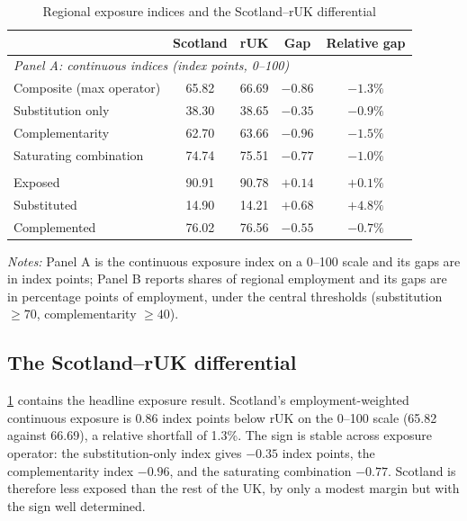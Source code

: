 \begin{table}[t]
\centering
\caption{Regional exposure indices and the Scotland--rUK differential}
\label{tab:headline}
\small
\begin{tabular}{lcccc}
\toprule
 & Scotland & rUK & Gap & Relative gap \\
\midrule
\multicolumn{5}{l}{\textit{Panel A: continuous indices (index points, 0--100)}} \\
Composite (max operator)   & 65.82 & 66.69 & $-0.86$ & $-1.3\%$ \\
Substitution only          & 38.30 & 38.65 & $-0.35$ & $-0.9\%$ \\
Complementarity            & 62.70 & 63.66 & $-0.96$ & $-1.5\%$ \\
Saturating combination     & 74.74 & 75.51 & $-0.77$ & $-1.0\%$ \\
\addlinespace
\multicolumn{5}{l}{\textit{Panel B: classified employment shares (\%)}} \\
Exposed        & 90.91 & 90.78 & $+0.14$ & $+0.1\%$ \\
Substituted    & 14.90 & 14.21 & $+0.68$ & $+4.8\%$ \\
Complemented   & 76.02 & 76.56 & $-0.55$ & $-0.7\%$ \\
\bottomrule
\end{tabular}
\begin{minipage}{0.92\textwidth}
\vspace{0.4em}\footnotesize
\textit{Notes:} 
Panel A is the continuous exposure index on a 0--100 scale and its gaps are in index points; Panel B reports shares of regional employment and its gaps are in percentage points of employment, under the central thresholds (substitution $\ge 70$, complementarity $\ge 40$).
\end{minipage}
\end{table}
 
\subsection{The Scotland--rUK differential}\label{sec:differential}
 
\cref{tab:headline} contains the headline exposure result. Scotland's employment-weighted continuous exposure is 0.86 index points below rUK on the 0--100 scale (65.82 against 66.69), a relative shortfall of 1.3\%. The sign is stable across exposure operator: the substitution-only index gives $-0.35$ index points, the complementarity index $-0.96$, and the saturating combination $-0.77$. 
Scotland is therefore less exposed than the rest of the UK, by only a modest margin but with the sign well determined.

